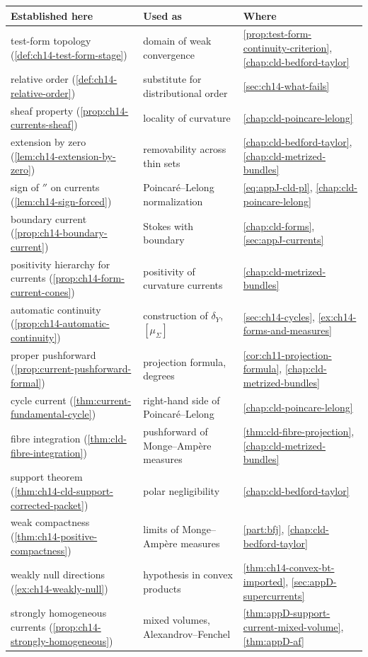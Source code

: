 \begin{center}
\small
\begin{tabular}{p{}|p{}|p{}}
\textbf{Established here}&\textbf{Used as}&\textbf{Where}\\ \hline
test-form topology
  (\cref{def:ch14-test-form-stage})
  &domain of weak convergence
  &\cref{prop:test-form-continuity-criterion},
   \cref{chap:cld-bedford-taylor}\\
relative order
  (\cref{def:ch14-relative-order})
  &substitute for distributional order
  &\cref{sec:ch14-what-fails}\\
sheaf property
  (\cref{prop:ch14-currents-sheaf})
  &locality of curvature
  &\cref{chap:cld-poincare-lelong}\\
extension by zero
  (\cref{lem:ch14-extension-by-zero})
  &removability across thin sets
  &\cref{chap:cld-bedford-taylor},
   \cref{chap:cld-metrized-bundles}\\
sign of $\dprime$ on currents
  (\cref{lem:ch14-sign-forced})
  &Poincar\'e--Lelong normalization
  &\eqref{eq:appJ-cld-pl},
   \cref{chap:cld-poincare-lelong}\\
boundary current
  (\cref{prop:ch14-boundary-current})
  &Stokes with boundary
  &\cref{chap:cld-forms},
   \cref{sec:appJ-currents}\\
positivity hierarchy for currents
  (\cref{prop:ch14-form-current-cones})
  &positivity of curvature currents
  &\cref{chap:cld-metrized-bundles}\\
automatic continuity
  (\cref{prop:ch14-automatic-continuity})
  &construction of $\delta_Y$, $[\mu_\Sigma]$
  &\cref{sec:ch14-cycles},
   \cref{ex:ch14-forms-and-measures}\\
proper pushforward
  (\cref{prop:current-pushforward-formal})
  &projection formula, degrees
  &\cref{cor:ch11-projection-formula},
   \cref{chap:cld-metrized-bundles}\\
cycle current
  (\cref{thm:current-fundamental-cycle})
  &right-hand side of Poincar\'e--Lelong
  &\cref{chap:cld-poincare-lelong}\\
fibre integration
  (\cref{thm:cld-fibre-integration})
  &pushforward of Monge--Amp\`ere measures
  &\cref{thm:cld-fibre-projection},
   \cref{chap:cld-metrized-bundles}\\
support theorem
  (\cref{thm:ch14-cld-support-corrected-packet})
  &polar negligibility
  &\cref{chap:cld-bedford-taylor}\\
weak compactness
  (\cref{thm:ch14-positive-compactness})
  &limits of Monge--Amp\`ere measures
  &\cref{part:bfj},
   \cref{chap:cld-bedford-taylor}\\
weakly null directions
  (\cref{ex:ch14-weakly-null})
  &hypothesis in convex products
  &\cref{thm:ch14-convex-bt-imported},
   \cref{sec:appD-supercurrents}\\
strongly homogeneous currents
  (\cref{prop:ch14-strongly-homogeneous})
  &mixed volumes, Alexandrov--Fenchel
  &\cref{thm:appD-support-current-mixed-volume},
   \cref{thm:appD-af}
\end{tabular}
\end{center}

